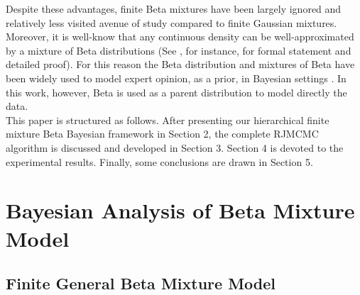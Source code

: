 \documentclass[journal,10pt]{elsart}
\begin{document}
Despite these advantages, finite Beta mixtures have been largely ignored and relatively less visited avenue of study compared to finite Gaussian mixtures.
Moreover, it is well-know that any continuous density can be well-approximated by a mixture of Beta distributions (See \cite{Diaconis1985}, for instance, for formal statement and detailed proof).
For this reason the Beta distribution and mixtures of Beta have been widely used to model expert opinion, as a prior, in Bayesian settings \cite{Gelfand1995,Brooks2001,Berkhof2003}.
In this work, however, Beta is used as a parent distribution to model directly the data.\\
This paper is structured as follows. After presenting our hierarchical finite mixture Beta Bayesian framework in Section 2,
the complete RJMCMC algorithm is discussed and developed in Section 3.
Section 4 is devoted to the experimental results.
Finally, some conclusions are drawn in Section 5.
\section{Bayesian Analysis of Beta Mixture Model}
\subsection{Finite General Beta Mixture Model}
\end{document}
